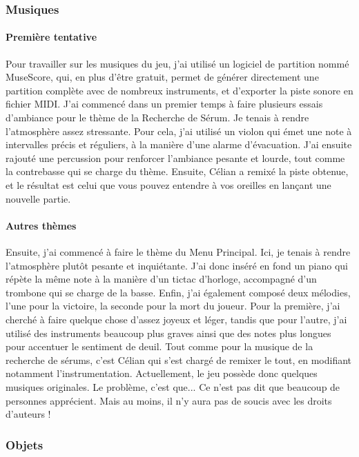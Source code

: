 \documentclass{article}
\begin{document}
\subsubsection{Musiques}
\paragraph{Première tentative}
Pour travailler sur les musiques du jeu, j'ai utilisé un logiciel de partition nommé MuseScore, qui, en plus d'être gratuit, permet de générer directement une partition complète avec de nombreux instruments, et d'exporter la piste sonore en fichier MIDI. J'ai commencé dans un premier temps à faire plusieurs essais d'ambiance pour le thème de la Recherche de Sérum. Je tenais à rendre l'atmosphère assez stressante. Pour cela, j'ai utilisé un violon qui émet une note à intervalles précis et réguliers, à la manière d'une alarme d'évacuation. J'ai ensuite rajouté une percussion pour renforcer l'ambiance pesante et lourde, tout comme la contrebasse qui se charge du thème. Ensuite, Célian a remixé la piste obtenue, et le résultat est celui que vous pouvez entendre à vos oreilles en lançant une nouvelle partie.

\paragraph{Autres thèmes}
Ensuite, j'ai commencé à faire le thème du Menu Principal. Ici, je tenais à rendre l'atmosphère plutôt pesante et inquiétante. J'ai donc inséré en fond un piano qui répète la même note à la manière d'un tictac d'horloge, accompagné d'un trombone qui se charge de la basse. Enfin, j'ai également composé deux mélodies, l'une pour la victoire, la seconde pour la mort du joueur. Pour la première, j'ai cherché à faire quelque chose d'assez joyeux et léger, tandis que pour l'autre, j'ai utilisé des instruments beaucoup plus graves ainsi que des notes plus longues pour accentuer le sentiment de deuil. Tout comme pour la musique de la recherche de sérums, c'est Célian qui s'est chargé de remixer le tout, en modifiant notamment l'instrumentation. Actuellement, le jeu possède donc quelques musiques originales. Le problème, c'est que... Ce n'est pas dit que beaucoup de personnes apprécient. Mais au moins, il n'y aura pas de soucis avec les droits d'auteurs !

\subsubsection{Objets}
\end{document}
